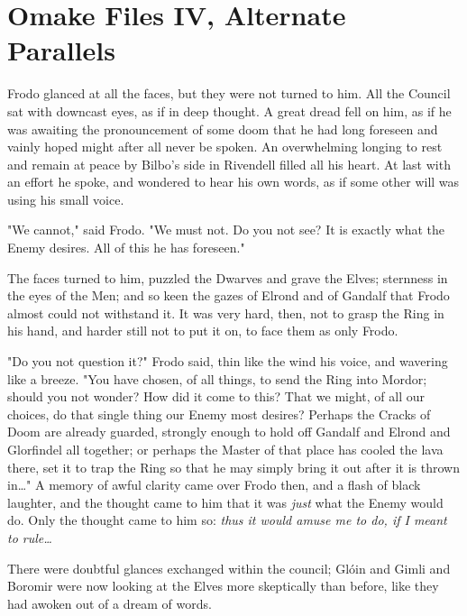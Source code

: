 \chapter{Omake Files IV, Alternate Parallels}


\noindent{}Frodo glanced at all the faces, but they were not turned to him. All the 
Council sat with downcast eyes, as if in deep thought. A great dread fell on 
him, as if he was awaiting the pronouncement of some doom that he had long 
foreseen and vainly hoped might after all never be spoken. An overwhelming 
longing to rest and remain at peace by Bilbo's side in Rivendell filled all his 
heart. At last with an effort he spoke, and wondered to hear his own words, as 
if some other will was using his small voice.

"We cannot," said Frodo. "We must not. Do you not see? It is exactly what the 
Enemy desires. All of this he has foreseen."

The faces turned to him, puzzled the Dwarves and grave the Elves; sternness in 
the eyes of the Men; and so keen the gazes of Elrond and of Gandalf that Frodo 
almost could not withstand it. It was very hard, then, not to grasp the Ring in 
his hand, and harder still not to put it on, to face them as only Frodo.

"Do you not question it?" Frodo said, thin like the wind his voice, and 
wavering like a breeze. "You have chosen, of all things, to send the Ring into 
Mordor; should you not wonder? How did it come to this? That we might, of all 
our choices, do that single thing our Enemy most desires? Perhaps the Cracks of 
Doom are already guarded, strongly enough to hold off Gandalf and Elrond and 
Glorfindel all together; or perhaps the Master of that place has cooled the 
lava there, set it to trap the Ring so that he may simply bring it out after it 
is thrown in{\ldots}" A memory of awful clarity came over Frodo then, and a 
flash of black laughter, and the thought came to him that it was \emph{just} 
what the Enemy would do. Only the thought came to him so: \emph{thus it would 
amuse me to do, if I meant to rule{\ldots}}

There were doubtful glances exchanged within the council; Glóin and Gimli and 
Boromir were now looking at the Elves more skeptically than before, like they 
had awoken out of a dream of words.

